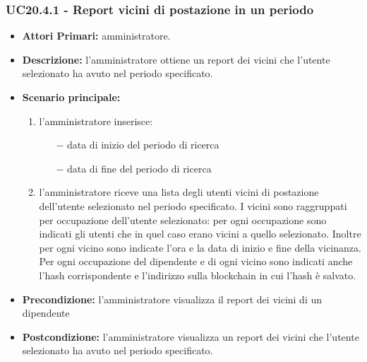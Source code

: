 \subsubsection{ UC20.4.1 - Report vicini di postazione in un periodo}
\begin{itemize}
	\item\textbf{Attori Primari:} 
	amministratore.
	\item\textbf{Descrizione:} 
	l'amministratore ottiene un report dei vicini che l'utente selezionato ha avuto nel periodo specificato.
	\item\textbf{Scenario principale:} 
	\begin{enumerate}
		\item l'amministratore inserisce:
		\begin{itemize}
			\item[$-$] data di inizio del periodo di ricerca
			\item[$-$] data di fine del periodo di ricerca
		\end{itemize}
		\item l'amministratore riceve una lista degli utenti vicini di postazione dell'utente selezionato nel periodo specificato. I vicini sono raggruppati per occupazione dell'utente selezionato: per ogni occupazione sono indicati gli utenti che in quel caso erano vicini a quello selezionato. Inoltre per ogni vicino sono indicate l'ora e la data di inizio e fine della vicinanza. Per ogni occupazione del dipendente e di ogni vicino sono indicati anche l'hash corrispondente e l'indirizzo sulla blockchain in cui l'hash è salvato.
	\end{enumerate}
	\item\textbf{Precondizione:} 
	l'amministratore visualizza il report dei vicini di un dipendente
	\item\textbf{Postcondizione:}
	l'amministratore visualizza un report dei vicini che l'utente selezionato ha avuto nel periodo specificato.
\end{itemize}



